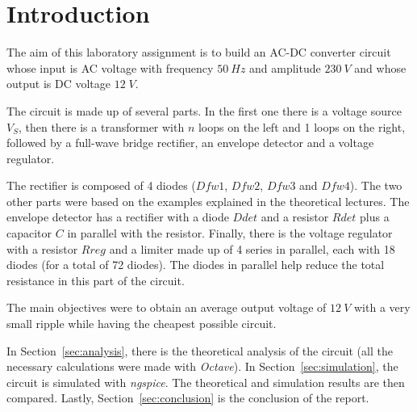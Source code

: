\section{Introduction}
\label{sec:introduction}


The aim of this laboratory assignment is to build an AC-DC converter circuit whose input is AC voltage with frequency $50 \ Hz$ and amplitude $230 \ V$ and whose output is DC voltage $12 \; V$.


The circuit is made up of several parts. In the first one there is a voltage source $V_S$, then there is a transformer with $n$ loops on the left and 1 loops on the right, followed by a full-wave bridge rectifier, an envelope detector and a voltage regulator.

The rectifier is composed of 4 diodes ($Dfw1$, $Dfw2$, $Dfw3$ and $Dfw4$). The two other parts were based on the examples explained in the theoretical lectures. The envelope detector has a rectifier with a diode $Ddet$ and a resistor $Rdet$ plus a capacitor $C$ in parallel with the resistor. Finally, there is the voltage regulator with a resistor $Rreg$ and a limiter made up of 4 series in parallel, each with 18 diodes (for a total of 72 diodes). The diodes in parallel help reduce the total resistance in this part of the circuit.


The main objectives were to obtain an average output voltage of $12 \ V$ with a very small ripple while having the cheapest possible circuit.


In Section~\ref{sec:analysis}, there is the theoretical analysis of the circuit (all the necessary calculations were made with \textit{Octave}). In Section~\ref{sec:simulation}, the circuit is simulated with \textit{ngspice}. The theoretical and simulation results are then compared. Lastly,  Section~\ref{sec:conclusion} is the conclusion of the report. 
